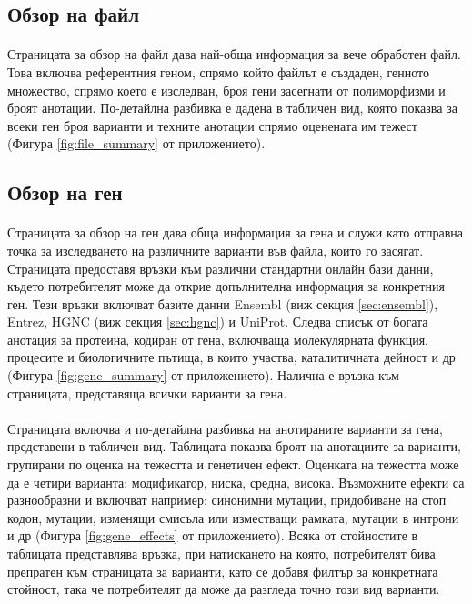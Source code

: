 \documentclass[pdftex,cyrillic,14pt,a4page,twoside,openright]{extreport}
\begin{document}
\subsection{Обзор на файл}
\paragraph{}
Страницата за обзор на файл дава най-обща информация за вече обработен файл. Това включва референтния геном, спрямо който файлът е създаден, генното множество, спрямо което е изследван, броя гени засегнати от полиморфизми и броят анотации. По-детайлна разбивка е дадена в табличен вид, която показва за всеки ген броя варианти и техните анотации спрямо оценената им тежест (Фигура \ref{fig:file_summary} от приложението).


\subsection{Обзор на ген}
\paragraph{}
Страницата за обзор на ген дава обща информация за гена и служи като отправна точка за изследването на различните варианти във файла, които го засягат. Страницата предоставя връзки към различни стандартни онлайн бази данни, където потребителят може да открие допълнителна информация за конкретния ген. Тези връзки включват базите данни Ensembl (виж секция \ref{sec:ensembl}), Entrez, HGNC (виж секция \ref{sec:hgnc}) и UniProt. Следва списък от богата анотация за протеина, кодиран от гена, включваща молекулярната функция, процесите и биологичните пътища, в които участва, каталитичната дейност и др (Фигура \ref{fig:gene_summary} от приложението). Налична е връзка към страницата, представяща всички варианти за гена.

\paragraph{}
Страницата включва и по-детайлна разбивка на анотираните варианти за гена, представени в табличен вид. Таблицата показва броят на анотациите за варианти, групирани по оценка на тежестта и генетичен ефект. Оценката на тежестта може да е четири варианта: модификатор, ниска, средна, висока. Възможните ефекти са разнообразни и включват например: синонимни мутации, придобиване на стоп кодон, мутации, изменящи смисъла или изместващи рамката, мутации в интрони и др (Фигура \ref{fig:gene_effects} от приложението). Всяка от стойностите в таблицата представлява връзка, при натискането на която, потребителят бива препратен към страницата за варианти, като се добавя филтър за конкретната стойност, така че потребителят да може да разгледа точно този вид варианти.
\end{document}
